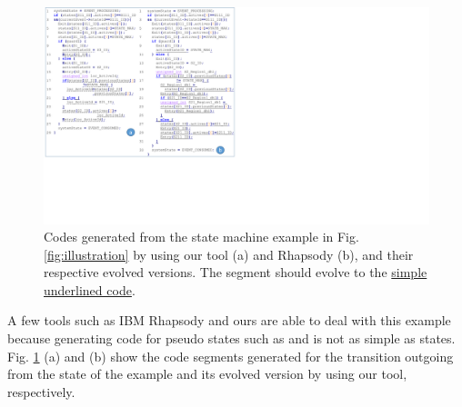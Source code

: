 \begin{figure}
	\centering
	\includegraphics[clip, trim=0.15cm 5.9cm 17.1cm 0.0cm, width=\columnwidth]{figures/highlight.pdf}
	\caption{Codes generated from the state machine example in Fig. \ref{fig:illustration} by using our tool (a) and Rhapsody (b), and their respective evolved versions. The \protect{} segment should evolve to the \protect\uline{simple underlined code}.} 
	\label{fig:generatedcode}
\end{figure}

A few tools such as IBM Rhapsody \cite{ibm_rhapsody} and ours are able to deal with this example because generating code for pseudo states such as  and  is not as simple as states.
Fig. \ref{fig:generatedcode} (a) and (b) show the code segments generated for the transition outgoing from the state  of the example and its evolved version by using our tool, respectively.

